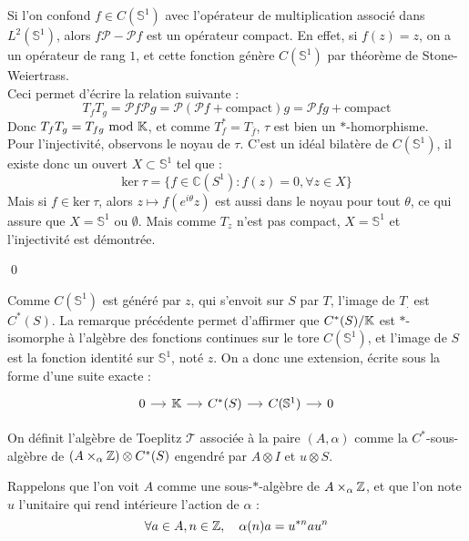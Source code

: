 \begin{dem}
Si l'on confond $f\in C(\mathbb S^1)$ avec l'opérateur de multiplication associé dans $L^2(\mathbb S^1)$, alors $f\mathcal P -\mathcal Pf$ est un opérateur compact. En effet, si $f(z)=z$, on a un opérateur de rang $1$, et cette fonction génère $C(\mathbb S^1)$ par théorème de Stone-Weiertrass. \\

Ceci permet d'écrire la relation suivante :
\[T_f T_g =\mathcal P f\mathcal P g =\mathcal P (\mathcal P f + \text{compact}) g = \mathcal P f g + \text{compact}\]
Donc $T_f T_g = T_{fg} \ \text{mod} \  \mathbb K$, et comme $T_f^*=T_{\overline f}$, $\tau$ est bien un $*$-homorphisme.\\

Pour l'injectivité, observons le noyau de $\tau$. C'est un idéal bilatère de $C(\mathbb S^1)$, il existe donc un ouvert $X \subset \mathbb S^1$ tel que :
\[\text{ker}\ \tau =\{f \in \mathbb C(S^1) : f(z)=0,\forall z \in X\}\]
Mais si $f\in \text{ker}\ \tau$, alors $z\mapsto f(e^{i\theta}z)$ est aussi dans le noyau pour tout $\theta$, ce qui assure que $X=\mathbb S^1$ ou $\emptyset$. Mais comme $T_z$ n'est pas compact, $X=\mathbb S^1$ et l'injectivité est démontrée.

\qed
\end{dem}
Comme $C(\mathbb S^1)$ est généré par $z$, qui s'envoit sur $S$ par $T$, l'image de $T_{.}$ est $C^*(S)$. La remarque précédente permet d'affirmer que $C^*(S)/\mathbb K$ est $*$-isomorphe à l'algèbre des fonctions continues sur le tore $C(\mathbb S^1)$, et l'image de $S$ est la fonction identité sur $\mathbb S^1$, noté $z$. On a donc une extension, écrite sous la forme d'une suite exacte :
\[\begin{tikzcd}[column sep =small] 0 \arrow{r} & \K \arrow{r} & C^*(S) \arrow{r} & C(\mathbb S ^1) \arrow{r} & 0 \end{tikzcd}\]

\begin{definition}
On définit l'algèbre de Toeplitz $\mathcal T$ associée à la paire $(A,\alpha)$ comme la $C^*$-sous-algèbre de $(A\times_\alpha \mathbb Z)\otimes C^*(S)$ engendré par $A\otimes I$ et $u\otimes S$. 
\end{definition}
Rappelons que l'on voit $A$ comme une sous-$*$-algèbre de $A\times_\alpha \mathbb Z$, et que l'on note $u$ l'unitaire qui rend intérieure l'action de $\alpha$ :
\[\forall a\in A, n\in \mathbb Z, \quad \alpha(n)a=u^{*n} a u^n\]

